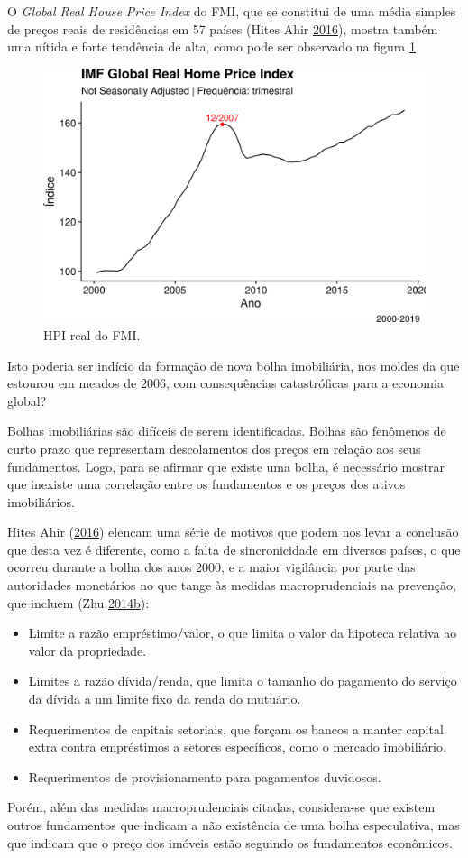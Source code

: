\documentclass[
	12pt,				%
	oneside,			%
	a4paper,			%
	chapter=TITLE,		%
	section=TITLE,		%
	english,			%
	brazil				%
	]{abntex2}
\begin{document}
O \emph{Global Real House Price Index} do \gls{FMI}, que se constitui de uma média
simples de preços reais de residências em 57 países (Hites Ahir \protect\hyperlink{ref-fmitwa}{2016}), mostra também uma
nítida e forte tendência de alta, como pode ser observado na figura
\ref{fig:global-rhpi}.
\begin{figure}[H]

{\centering \includegraphics[width=0.7\linewidth]{images/global-rhpi-1} 

}

\caption{HPI real do FMI.}\label{fig:global-rhpi}
\end{figure}
Isto poderia ser indício da formação de nova bolha imobiliária, nos moldes da
que estourou em meados de 2006, com consequências catastróficas para a economia
global?

Bolhas imobiliárias são difíceis de serem identificadas. Bolhas são fenômenos
de curto prazo que representam descolamentos dos preços em relação aos seus
fundamentos. Logo, para se afirmar que existe uma bolha, é necessário mostrar
que inexiste uma correlação entre os fundamentos e os preços dos ativos
imobiliários.

Hites Ahir (\protect\hyperlink{ref-fmitwa}{2016}) elencam uma série de motivos que podem nos levar a conclusão que desta
vez é diferente, como a falta de sincronicidade em diversos países, o que
ocorreu durante a bolha dos anos 2000, e a maior vigilância por parte das
autoridades monetários no que tange às medidas macroprudenciais na prevenção,
que incluem (Zhu \protect\hyperlink{ref-fmiem}{2014}\protect\hyperlink{ref-fmiem}{b}):
\begin{itemize}
\tightlist
\item
  Limite a razão empréstimo/valor, o que limita o valor da hipoteca relativa
  ao valor da propriedade.
\item
  Limites a razão dívida/renda, que limita o tamanho do pagamento do serviço da
  dívida a um limite fixo da renda do mutuário.
\item
  Requerimentos de capitais setoriais, que forçam os bancos a manter capital
  extra contra empréstimos a setores específicos, como o mercado imobiliário.
\item
  Requerimentos de provisionamento para pagamentos duvidosos.
\end{itemize}
Porém, além das medidas macroprudenciais citadas, considera-se que existem
outros fundamentos que indicam a não existência de uma bolha especulativa, mas
que indicam que o preço dos imóveis estão seguindo os fundamentos econômicos.
\end{document}
